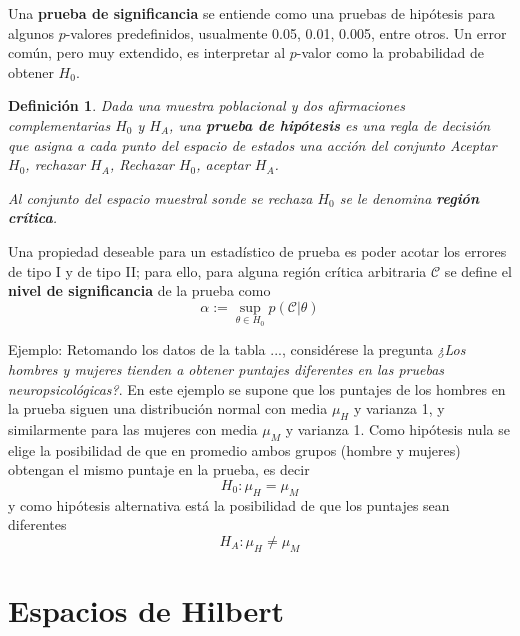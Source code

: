 \documentclass[12pt,letterpaper]{book}
\newtheorem{definicion}{Definición}[chapter]
\begin{document}
Una \textbf{prueba de significancia} se entiende como una pruebas de hipótesis para algunos $p$-valores predefinidos, usualmente 0.05, 0.01, 0.005, entre otros.
%
Un error común, pero muy extendido, es interpretar al $p$-valor como la probabilidad de obtener $H_0$.

\begin{definicion}
Dada una muestra poblacional y dos afirmaciones complementarias $H_0$ y $H_A$, una \textbf{prueba de hipótesis} es una regla de decisión que asigna a cada punto del espacio de estados una acción del conjunto Aceptar $H_0$, rechazar $H_A$, Rechazar $H_0$, aceptar $H_A$.

Al conjunto del espacio muestral sonde se rechaza $H_0$ se le denomina \textbf{región crítica}. 
\end{definicion}

Una propiedad deseable para un estadístico de prueba es poder acotar los errores de tipo I y de tipo II; para ello, para alguna región crítica arbitraria $\mathcal{C}$ se define el \textbf{nivel de significancia} de la prueba como
\begin{equation}
\alpha := \sup_{\theta \in H_0} p(\mathcal{C} \lvert \theta)
\end{equation}

Ejemplo:
Retomando los datos de la tabla ..., considérese la pregunta \textit{¿Los hombres y mujeres tienden
a obtener puntajes diferentes en las pruebas neuropsicológicas?}. 
%
En este ejemplo se supone que los puntajes de los hombres en la prueba siguen una distribución normal con media $\mu_H$ y varianza 1, y similarmente para las mujeres con media $\mu_M$ y varianza 1.
%
Como hipótesis nula se elige la posibilidad de que en promedio ambos grupos (hombre y mujeres) obtengan el mismo puntaje en la prueba, es decir
\begin{equation}
H_0 : \mu_H = \mu_M
\end{equation}
y como hipótesis alternativa está la posibilidad de que los puntajes sean diferentes
\begin{equation}
H_A : \mu_H \neq \mu_M
\end{equation}


\section{Espacios de Hilbert}
\end{document}
